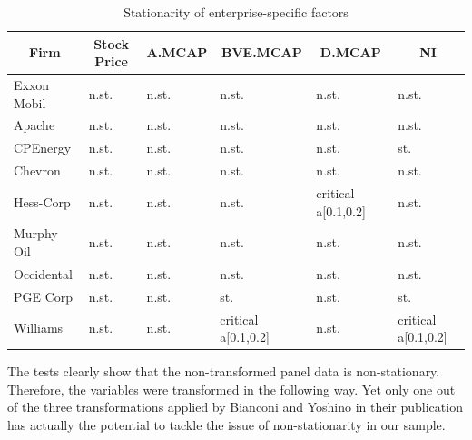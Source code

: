 \documentclass[a4paper]{article}
\begin{document}
\begin{table}[ht] 
\centering
\begin{tabular}{l| l| l| l| l| l}
\hline
\hline
\multicolumn{1}{c|}{Firm} & \multicolumn{1}{c|}{Stock Price} & \multicolumn{1}{c|}{A.MCAP} & \multicolumn{1}{c|}{BVE.MCAP} & \multicolumn{1}{c|}{D.MCAP} & \multicolumn{1}{c}{NI} \\
\hline
Exxon Mobil & n.st. & n.st. & n.st. & n.st. & n.st. \\ 
Apache & n.st. & n.st. & n.st. & n.st. & n.st. \\ 
CPEnergy & n.st. & n.st. & n.st. & n.st. & st. \\ 
Chevron & n.st. & n.st. & n.st. & n.st. & n.st. \\ 
Hess-Corp & n.st. & n.st. & n.st. & critical a[0.1,0.2] & n.st. \\
Murphy Oil & n.st. & n.st. & n.st. & n.st. & n.st. \\ 
Occidental & n.st. & n.st. & n.st. & n.st. & n.st. \\ 
PGE Corp & n.st. & n.st. & st. & n.st. & st. \\ 
Williams & n.st. & n.st. & critical a[0.1,0.2] & n.st. & critical a[0.1,0.2] \\ 
\hline
\hline
\end{tabular}
\label{}
\caption{Stationarity of enterprise-specific factors} 
\end{table}

The tests clearly show that the non-transformed panel data is non-stationary. Therefore, the variables were transformed in the following way. Yet only one out of the three transformations applied by Bianconi and Yoshino in their publication has actually the potential to tackle the issue of non-stationarity in our sample.
\end{document}
